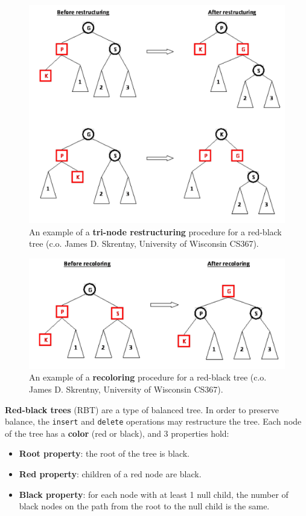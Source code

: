 \begin{figure}[tb]
\centering
\includegraphics[width=0.75\columnwidth]{Figures/restructure.pdf}
\caption{An example of a \textbf{tri-node restructuring} procedure for a red-black tree (c.o. James D. Skrentny, University of Wisconsin CS367).}
\label{fig:trinoderestructuring}
\end{figure}

\begin{figure}[tb]
\centering
\includegraphics[width=0.75\columnwidth]{Figures/recoloring.pdf}
\caption{An example of a \textbf{recoloring} procedure for a red-black tree (c.o. James D. Skrentny, University of Wisconsin CS367).}
\label{fig:recoloring}
\end{figure}

\textbf{Red-black trees} (RBT) are a type of balanced tree. In order to preserve balance, the \texttt{insert} and \texttt{delete} operations may restructure the tree. Each node of the tree has a \textbf{color} (red or black), and 3 properties hold:

\begin{itemize}
	\item \textbf{Root property}: the root of the tree is black.
	\item \textbf{Red property}: children of a red node are black. 
	\item \textbf{Black property}: for each node with at least 1 null child, the number of black nodes on the path from the root to the null child is the same. 
\end{itemize}

